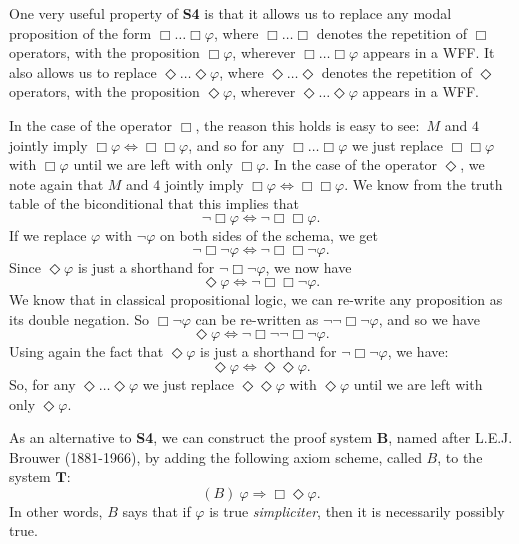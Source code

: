 \documentclass[11pt]{article}
\theoremstyle{definition}
\theoremstyle{remark}
\begin{document}
One very useful property of \textbf{S4} is that it allows us to replace any modal proposition of the form $\Box\dots\Box\varphi$, where $\Box\dots\Box$ denotes the repetition of $\Box$ operators, with the proposition $\Box\varphi$, wherever $\Box\dots\Box\varphi$ appears in a WFF. It also allows us to replace $\Diamond\dots\Diamond\varphi$, where $\Diamond\dots\Diamond$ denotes the repetition of $\Diamond$ operators, with the proposition $\Diamond\varphi$, wherever $\Diamond\dots\Diamond\varphi$ appears in a WFF.\par 

In the case of the operator $\Box$, the reason this holds is easy to see:\ $M$ and $4$ jointly imply $\Box\varphi \iff \Box\Box \varphi$, and so for any $\Box\dots\Box\varphi$ we just replace $\Box\Box \varphi$ with $\Box\varphi$ until we are left with only $\Box\varphi$. In the case of the operator $\Diamond$, we note again that $M$ and $4$ jointly imply $\Box\varphi \iff \Box\Box \varphi$. We know from the truth table of the biconditional that this implies that $$\neg\Box\varphi \iff \neg\Box\Box \varphi.$$ If we replace $\varphi$ with $\neg\varphi$ on both sides of the schema, we get $$\neg\Box\neg\varphi \iff \neg\Box\Box \neg\varphi.$$ Since $\Diamond\varphi$ is just a shorthand for $\neg\Box\neg\varphi$, we now have $$\Diamond\varphi \iff \neg\Box\Box \neg\varphi.$$ We know that in classical propositional logic, we can re-write any proposition as its double negation. So $\Box \neg\varphi$ can be re-written as $\neg\neg\Box \neg\varphi$, and so we have $$\Diamond\varphi \iff \neg\Box\neg\neg\Box \neg\varphi.$$ Using again the fact that $\Diamond\varphi$ is just a shorthand for $\neg\Box\neg\varphi$, we have:
$$\Diamond\varphi \iff \Diamond\Diamond\varphi.$$
So, for any $\Diamond\dots\Diamond\varphi$ we just replace $\Diamond\Diamond \varphi$ with $\Diamond\varphi$ until we are left with only $\Diamond\varphi$.\par

As an alternative to \textbf{S4}, we can construct the proof system $\mathbf{B}$, named after L.E.J. Brouwer (1881-1966), by adding the following axiom scheme, called $B$, to the system $\mathbf{T}$:
$$(B) \ \varphi\Rightarrow\Box\Diamond \varphi.$$
In other words, $B$ says that if $\varphi$ is true \textit{simpliciter}, then it is necessarily possibly true.\par
\end{document}
